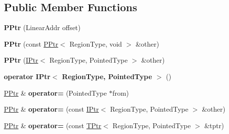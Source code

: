 \subsection*{Public Member Functions}
\begin{DoxyCompactItemize}
\item 
{\bfseries P\+Ptr} (Linear\+Addr offset)\hypertarget{classalps_1_1BaseRelativePointer_1_1PPtr_a3d30f50e8ff9606e1a70e9243e7435c5}{}\label{classalps_1_1BaseRelativePointer_1_1PPtr_a3d30f50e8ff9606e1a70e9243e7435c5}

\item 
{\bfseries P\+Ptr} (const \hyperlink{classalps_1_1BaseRelativePointer_1_1PPtr}{P\+Ptr}$<$ Region\+Type, void $>$ \&other)\hypertarget{classalps_1_1BaseRelativePointer_1_1PPtr_a72d3074d889b18799a26545ff70fb9fc}{}\label{classalps_1_1BaseRelativePointer_1_1PPtr_a72d3074d889b18799a26545ff70fb9fc}

\item 
{\bfseries P\+Ptr} (\hyperlink{classalps_1_1BaseRelativePointer_1_1IPtr}{I\+Ptr}$<$ Region\+Type, Pointed\+Type $>$ \&other)\hypertarget{classalps_1_1BaseRelativePointer_1_1PPtr_af2c23a1a1e4a25b955c0a19e742734f1}{}\label{classalps_1_1BaseRelativePointer_1_1PPtr_af2c23a1a1e4a25b955c0a19e742734f1}

\item 
{\bfseries operator I\+Ptr$<$ Region\+Type, Pointed\+Type $>$} ()\hypertarget{classalps_1_1BaseRelativePointer_1_1PPtr_acea6bf55fc7565381b9dde632f0d8efc}{}\label{classalps_1_1BaseRelativePointer_1_1PPtr_acea6bf55fc7565381b9dde632f0d8efc}

\item 
\hyperlink{classalps_1_1BaseRelativePointer_1_1PPtr}{P\+Ptr} \& {\bfseries operator=} (Pointed\+Type $\ast$from)\hypertarget{classalps_1_1BaseRelativePointer_1_1PPtr_aafa170c5c498ad4f508f88fc0ae6ec38}{}\label{classalps_1_1BaseRelativePointer_1_1PPtr_aafa170c5c498ad4f508f88fc0ae6ec38}

\item 
\hyperlink{classalps_1_1BaseRelativePointer_1_1PPtr}{P\+Ptr} \& {\bfseries operator=} (const \hyperlink{classalps_1_1BaseRelativePointer_1_1IPtr}{I\+Ptr}$<$ Region\+Type, Pointed\+Type $>$ \&other)\hypertarget{classalps_1_1BaseRelativePointer_1_1PPtr_a788caa799b260204b7d39fe6de99fd0f}{}\label{classalps_1_1BaseRelativePointer_1_1PPtr_a788caa799b260204b7d39fe6de99fd0f}

\item 
\hyperlink{classalps_1_1BaseRelativePointer_1_1PPtr}{P\+Ptr} \& {\bfseries operator=} (const \hyperlink{classalps_1_1BaseRelativePointer_1_1TPtr}{T\+Ptr}$<$ Region\+Type, Pointed\+Type $>$ \&tptr)\hypertarget{classalps_1_1BaseRelativePointer_1_1PPtr_ad802b446e818406ec4295efade695a1e}{}\label{classalps_1_1BaseRelativePointer_1_1PPtr_ad802b446e818406ec4295efade695a1e}


\end{DoxyCompactItemize}
